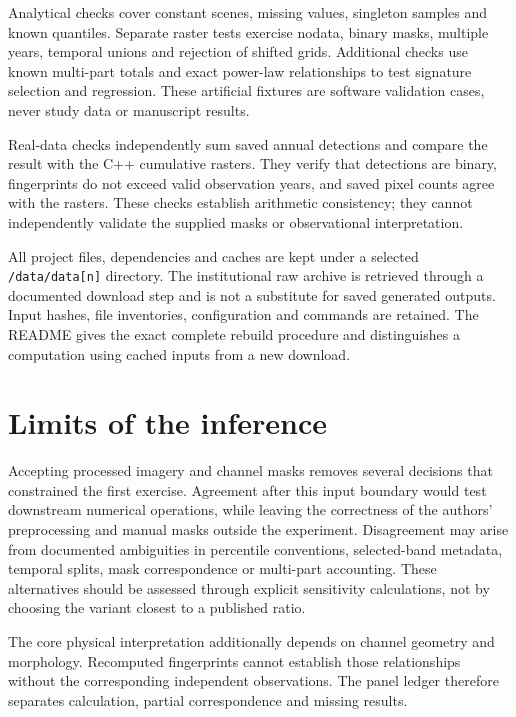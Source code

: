 \documentclass[11pt]{article}
\begin{document}
Analytical checks cover constant scenes, missing values, singleton samples
and known quantiles. Separate raster tests exercise nodata, binary masks,
multiple years, temporal unions and rejection of shifted grids. Additional
checks use known multi-part totals and exact power-law relationships to
test signature selection and regression. These artificial fixtures are
software validation cases, never study data or manuscript results.

Real-data checks independently sum saved annual detections and compare the
result with the C++ cumulative rasters. They verify that detections are
binary, fingerprints do not exceed valid observation years, and saved pixel
counts agree with the rasters. These checks establish arithmetic consistency;
they cannot independently validate the supplied masks or observational
interpretation.


All project files, dependencies and caches are kept under a selected
\texttt{/data/data[n]} directory. The institutional raw archive is retrieved
through a documented download step and is not a substitute for saved
generated outputs. Input hashes, file inventories, configuration and commands
are retained. The README gives the exact complete rebuild procedure and
distinguishes a computation using cached inputs from a new download.

\section{Limits of the inference}
Accepting processed imagery and channel masks removes several decisions
that constrained the first exercise. Agreement after this input boundary
would test downstream numerical operations, while leaving the correctness
of the authors' preprocessing and manual masks outside the experiment.
Disagreement may arise from documented ambiguities in percentile conventions,
selected-band metadata, temporal splits, mask correspondence or multi-part
accounting. These alternatives should be assessed through explicit
sensitivity calculations, not by choosing the variant closest to a published
ratio.

The core physical interpretation additionally depends on channel geometry
and morphology. Recomputed fingerprints cannot establish those relationships
without the corresponding independent observations. The panel ledger
therefore separates calculation, partial correspondence and missing results.
\end{document}
